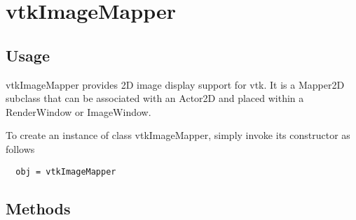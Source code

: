 \section{vtkImageMapper}

\subsection{Usage}

 vtkImageMapper provides 2D image display support for vtk.
 It is a Mapper2D subclass that can be associated with an Actor2D
 and placed within a RenderWindow or ImageWindow.

To create an instance of class vtkImageMapper, simply
invoke its constructor as follows
\begin{verbatim}
  obj = vtkImageMapper
\end{verbatim}
\subsection{Methods}

